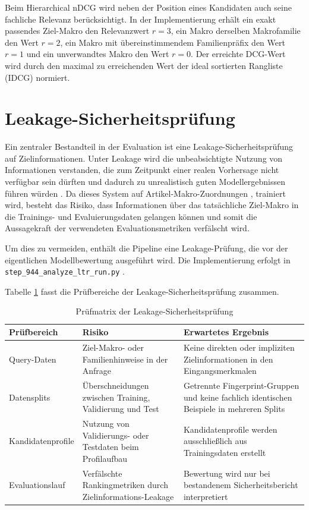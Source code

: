 Beim Hierarchical nDCG wird neben der Position eines Kandidaten auch seine fachliche Relevanz berücksichtigt. In der Implementierung erhält ein exakt passendes Ziel-Makro den Relevanzwert $r=3$, ein Makro derselben Makrofamilie den Wert $r=2$, ein Makro mit übereinstimmendem Familienpräfix den Wert $r=1$ und ein unverwandtes Makro den Wert $r=0$. Der erreichte DCG-Wert wird durch den maximal zu erreichenden Wert der ideal sortierten Rangliste (IDCG) normiert.


\section{Leakage-Sicherheitsprüfung}

Ein zentraler Bestandteil in der Evaluation ist eine Leakage-Sicherheitsprüfung auf Zielinformationen. 
Unter Leakage wird die unbeabsichtigte Nutzung von Informationen verstanden, die zum Zeitpunkt einer realen Vorhersage nicht verfügbar sein dürften und dadurch zu unrealistisch guten Modellergebnissen führen würden \parencite{kaufman2012leakage}.
Da dieses System auf Artikel-Makro-Zuordnungen \parencite{EPLANArtikelverwaltung}, \parencite{EPLAN-Makros} trainiert wird, besteht das Risiko, 
dass Informationen über das tatsächliche Ziel-Makro \parencite{EPLAN-Makros} in die Trainings- und Evaluierungsdaten gelangen können und somit die Aussagekraft der verwendeten Evaluationsmetriken verfälscht wird.

Um dies zu vermeiden, enthält die Pipeline eine Leakage-Prüfung, die vor der eigentlichen Modellbewertung ausgeführt wird.
Die Implementierung erfolgt in \texttt{step\_944\_analyze\_ltr\_run.py} \parencite{srcStep944}.

Tabelle \ref{tab:leakage_pruefmatrix} fasst die Prüfbereiche der Leakage-Sicherheitsprüfung zusammen.

\begin{table}[H]
  \centering
  \setlength{\tabcolsep}{4pt}
  \renewcommand{\arraystretch}{1.1}
  \caption{Prüfmatrix der Leakage-Sicherheitsprüfung}
  \label{tab:leakage_pruefmatrix}
  \begin{tabularx}{\textwidth}{>{\raggedright\arraybackslash}p{3.1cm} >{\raggedright\arraybackslash}p{4.0cm} >{\raggedright\arraybackslash}X}
    \toprule
    \textbf{Prüfbereich} & \textbf{Risiko} & \textbf{Erwartetes Ergebnis} \\
    \midrule
    Query-Daten & Ziel-Makro- oder Familienhinweise in der Anfrage & Keine direkten oder impliziten Zielinformationen in den Eingangsmerkmalen \\
    Datensplits & Überschneidungen zwischen Training, Validierung und Test & Getrennte Fingerprint-Gruppen und keine fachlich identischen Beispiele in mehreren Splits \\
    Kandidatenprofile & Nutzung von Validierungs- oder Testdaten beim Profilaufbau & Kandidatenprofile werden ausschließlich aus Trainingsdaten erstellt \\
    Evaluationslauf & Verfälschte Rankingmetriken durch Zielinformations-Leakage & Bewertung wird nur bei bestandenem Sicherheitsbericht interpretiert \\
    \bottomrule
  \end{tabularx}
\end{table}

